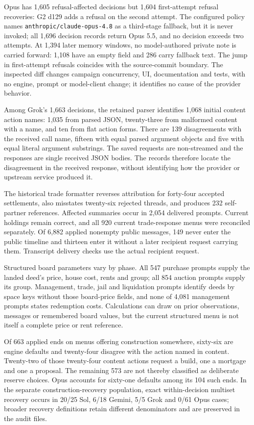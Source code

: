Opus has 1,605 refusal-affected decisions but 1,604 first-attempt refusal recoveries: G2 d129 adds a refusal on the second attempt. The configured policy names \texttt{anthropic/claude-opus-4.8} as a third-stage fallback, but it is never invoked; all 1,696 decision records return Opus 5.5, and no decision exceeds two attempts. At 1,394 later memory windows, no model-authored private note is carried forward: 1,108 have an empty field and 286 carry fallback text. The jump in first-attempt refusals coincides with the source-commit boundary. The inspected diff changes campaign concurrency, UI, documentation and tests, with no engine, prompt or model-client change; it identifies no cause of the provider behavior.

Among Grok's 1,663 decisions, the retained parser identifies 1,068 initial content action names: 1,035 from parsed JSON, twenty-three from malformed content with a name, and ten from flat action forms. There are 139 disagreements with the received call name, fifteen with equal parsed argument objects and five with equal literal argument substrings. The saved requests are non-streamed and the responses are single received JSON bodies. The records therefore locate the disagreement in the received response, without identifying how the provider or upstream service produced it.

The historical trade formatter reverses attribution for forty-four accepted settlements, also misstates twenty-six rejected threads, and produces 232 self-partner references. Affected summaries occur in 2,054 delivered prompts. Current holdings remain correct, and all 920 current trade-response menus were reconciled separately. Of 6,882 applied nonempty public messages, 149 never enter the public timeline and thirteen enter it without a later recipient request carrying them. Transcript delivery checks use the actual recipient request.

Structured board parameters vary by phase. All 547 purchase prompts supply the landed deed's price, house cost, rents and group; all 854 auction prompts supply its group. Management, trade, jail and liquidation prompts identify deeds by space keys without those board-price fields, and none of 4,081 management prompts states redemption costs. Calculations can draw on prior observations, messages or remembered board values, but the current structured menu is not itself a complete price or rent reference.

Of 663 applied ends on menus offering construction somewhere, sixty-six are engine defaults and twenty-four disagree with the action named in content. Twenty-two of those twenty-four content actions request a build, one a mortgage and one a proposal. The remaining 573 are not thereby classified as deliberate reserve choices. Opus accounts for sixty-one defaults among its 104 such ends. In the separate construction-recovery population, exact within-decision multiset recovery occurs in 20/25 Sol, 6/18 Gemini, 5/5 Grok and 0/61 Opus cases; broader recovery definitions retain different denominators and are preserved in the audit files.

